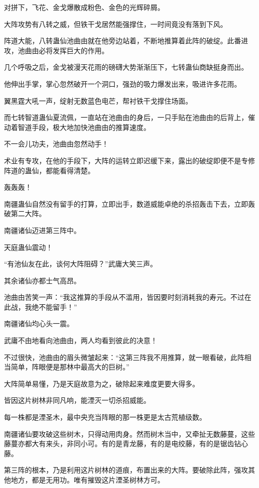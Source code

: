 \begin{this_body}
对拼下，飞花、金戈爆散成粉色、金色的光辉碎屑。

大阵攻势有八转之威，但铁干戈居然能强撑住，一时间竟没有落到下风。

阵道大能，八转蛊仙池曲由就在他旁边站着，不断地推算着此阵的破绽。此番进攻，池曲由必将发挥巨大的作用。

几个呼吸之后，金戈被漫天花雨的磅礴大势渐渐压下，七转蛊仙商缺挺身而出。

他伸出手掌，掌心忽然破开一个洞口，强劲的吸力爆发出来，吸进许多花雨。

翼黑霆大吼一声，绽射无数蓝色电芒，帮衬铁干戈撑住场面。

而七转智道蛊仙夏流佩，一直站在池曲由的身后，一只手贴在池曲由的后背上，催动着智道手段，极大地加快池曲由的推算速度。

不一会儿功夫，池曲由忽然动手！

术业有专攻，在他的手段下，大阵的运转立即迟缓下来，露出的破绽即便不是专修阵道的蛊仙，都能看得清楚。

轰轰轰！

南疆蛊仙自然没有留手的打算，立即出手，数道威能卓绝的杀招轰击下去，立即轰破第二大阵。

南疆诸仙迈进第三阵中。

天庭蛊仙震动！

“有池仙友在此，谈何大阵阻碍？”武庸大笑三声。

其余诸仙亦都士气高昂。

池曲由苦笑一声：“我这推算的手段从不滥用，皆因要时刻消耗我的寿元。不过在此战，我绝不能留手！”

南疆诸仙均心头一震。

武庸不由地看向池曲由，两人均看到彼此的决意！

不过很快，池曲由的眉头微皱起来：“这第三阵我不用推算，就一眼看破，此阵相当简单，阵眼便是那林中最高大的巨树。”

大阵简单易懂，乃是天庭故意为之，破除起来难度更要大得多。

皆因这片树林非同凡响，能湮灭一切杀招威能。

每一株都是湮圣木，最中央充当阵眼的那一株更是太古荒植级数。

南疆诸仙要攻破这些树木，只得动用肉身。然而树木当中，又牵扯无数藤蔓，这些藤蔓亦都大有来头，非同小可。有的是青龙藤，有的是电绞藤，有的是锯齿钻心藤。

第三阵的根本，乃是利用这片树林的道痕，布置出来的大阵。要破除此阵，强攻其他地方，都是无用功。唯有摧毁这片湮圣树林方可。


\end{this_body}
